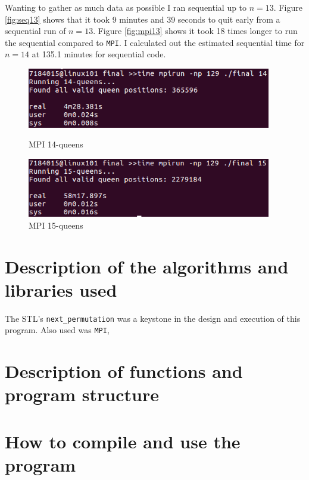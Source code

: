 \documentclass{article}
\begin{document}
Wanting to gather as much data as possible I ran sequential up to $n=13$. Figure 
\ref{fig:seq13} shows that it took 9 minutes and 39 seconds to quit early from a 
sequential run of $n=13$. Figure \ref{fig:mpi13} shows it took 18 times longer 
to run the sequential compared to \verb|MPI|. I calculated out the estimated 
sequential time for $n=14$ at 135.1 minutes for sequential code.

\begin{figure}[h]
    \centering
    \begin{minipage}{0.49\textwidth}
        \centering
        \includegraphics[width=0.95\textwidth]{MPI_14}
        \caption{MPI 14-queens}
        \label{fig:mpi14}
    \end{minipage}\hfill
    \begin{minipage}{0.49\textwidth}
        \centering
        \includegraphics[width=0.95\textwidth]{MPI_15}
        \caption{MPI 15-queens}
        \label{fig:mpi15}
    \end{minipage}
\end{figure}

\section{Description of the algorithms and libraries used}
The STL's \verb|next_permutation| was a keystone in the design and execution of 
this program. Also used was \verb|MPI|, 

\section{Description of functions and program structure}

\newpage
\section{How to compile and use the program}
\end{document}
